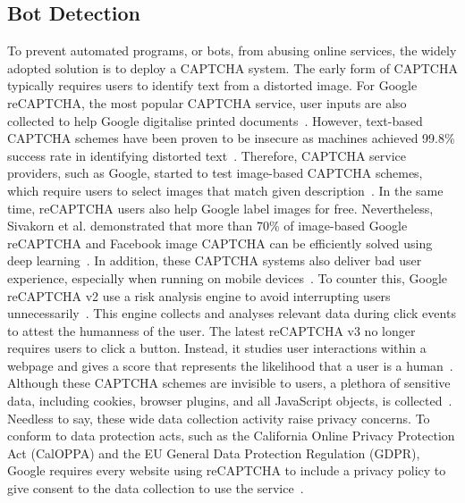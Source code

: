 \subsection{Bot Detection}

To prevent automated programs, or bots, from abusing online services, the widely adopted solution is to deploy a CAPTCHA system. The early form of CAPTCHA typically requires users to identify text from a distorted image. For Google reCAPTCHA, the most popular CAPTCHA service, user inputs are also collected to help Google digitalise printed documents~\cite{von2008recaptcha}. However, text-based CAPTCHA schemes have been proven to be insecure as machines achieved 99.8\% success rate in identifying distorted text~\cite{yan2008low,5395072,goodfellow2013multi}. Therefore, CAPTCHA service providers, such as Google, started to test image-based CAPTCHA schemes, which require users to select images that match given description~\cite{Shet2014}. In the same time, reCAPTCHA users also help Google label images for free. Nevertheless, Sivakorn et al. demonstrated that more than 70\% of image-based Google reCAPTCHA and Facebook image CAPTCHA can be efficiently solved using deep learning~\cite{sivakorn2016robot,Zhou:2018:BGR:3280489.3280510}. In addition, these CAPTCHA systems also deliver bad user experience, especially when running on mobile devices~\cite{reynaga2013usability}. To counter this, Google reCAPTCHA v2 use a risk analysis engine to avoid interrupting users unnecessarily~\cite{Google2019}. This engine collects and analyses relevant data during click events to attest the humanness of the user. The latest reCAPTCHA v3 no longer requires users to click a button. Instead, it studies user interactions within a webpage and gives a score that represents the likelihood that a user is a human~\cite{Google2018}. Although these CAPTCHA schemes are invisible to users, a plethora of sensitive data, including cookies, browser plugins, and all JavaScript objects, is collected~\cite{LaraOReilly2015}. Needless to say, these wide data collection activity raise privacy concerns. To conform to data protection acts, such as the California Online Privacy Protection Act (CalOPPA) and the EU General Data Protection Regulation (GDPR), Google requires every website using reCAPTCHA to include a privacy policy to give consent to the data collection to use the service~\cite{Pegarella2018}.